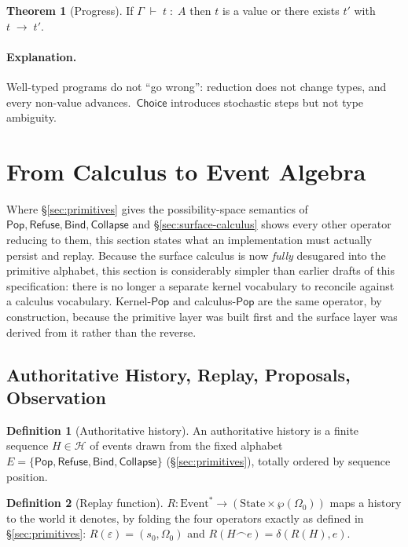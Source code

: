 \documentclass[12pt]{article}
\newcommand{\Entails}{\;\vdash\;}
\newcommand{\Types}{\;:\;}
\newcommand{\Pop}{\mathsf{Pop}}
\newcommand{\Choice}{\mathsf{Choice}}
\newcommand{\Ctx}{\Gamma}
\newcommand{\ReducesTo}{\;\longrightarrow\;}
\newcommand{\Judgement}[3]{#1 \Entails #2 \Types #3}
\theoremstyle{definition}
\newtheorem{definition}{Definition}
\newtheorem{theorem}{Theorem}
\newcommand{\Hist}{H}
\newcommand{\Replay}{R}
\newcommand{\EventStar}{\mathrm{Event}^{*}}
\newcommand{\RefuseOp}{\mathsf{Refuse}}
\newcommand{\CollapseOp}{\mathsf{Collapse}}
\newcommand{\BindOp}{\mathsf{Bind}}
\newcommand{\CalH}{\mathcal{H}}
\newcommand{\OptZero}{\Omega_0}
\begin{document}
\begin{theorem}[Progress]
If $\Judgement{\Ctx}{t}{A}$ then $t$ is a value or there exists $t'$ with $t \ReducesTo t'$.
\end{theorem}

\paragraph{Explanation.}
Well-typed programs do not ``go wrong'': reduction does not change types, and every non-value advances. 
$\,\Choice$ introduces stochastic steps but not type ambiguity.

\section{From Calculus to Event Algebra}
\label{sec:kernel}

Where \S\ref{sec:primitives} gives the possibility-space semantics of $\Pop,\RefuseOp,\BindOp,\CollapseOp$ and \S\ref{sec:surface-calculus} shows every other operator reducing to them, this section states what an implementation must actually persist and replay. Because the surface calculus is now \emph{fully} desugared into the primitive alphabet, this section is considerably simpler than earlier drafts of this specification: there is no longer a separate kernel vocabulary to reconcile against a calculus vocabulary. Kernel-$\Pop$ and calculus-$\Pop$ are the same operator, by construction, because the primitive layer was built first and the surface layer was derived from it rather than the reverse.

\subsection{Authoritative History, Replay, Proposals, Observation}

\begin{definition}[Authoritative history]
An authoritative history is a finite sequence $\Hist \in \CalH$ of events drawn from the fixed alphabet $E = \{\Pop,\RefuseOp,\BindOp,\CollapseOp\}$ (\S\ref{sec:primitives}), totally ordered by sequence position.
\end{definition}

\begin{definition}[Replay function]
$\Replay : \EventStar \to (\mathrm{State}\times\wp(\OptZero))$ maps a history to the world it denotes, by folding the four operators exactly as defined in \S\ref{sec:primitives}: $\Replay(\varepsilon) = (s_0,\OptZero)$ and $\Replay(\Hist \frown e) = \delta(\Replay(\Hist), e)$.
\end{definition}
\end{document}
